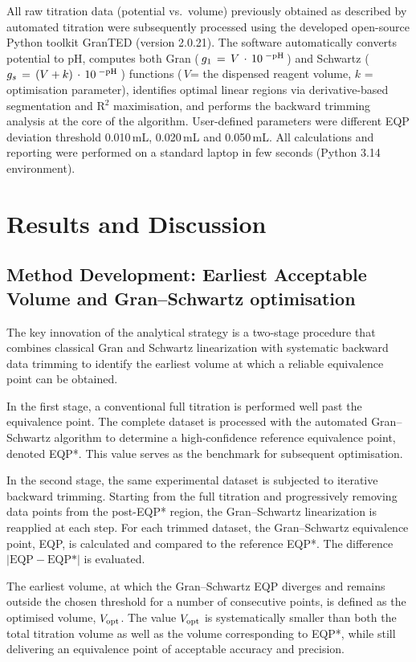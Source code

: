 \documentclass[twoside,twocolumn,9pt]{article}
\begin{document}
All raw titration data (potential vs.\, volume) previously obtained as described by automated titration were subsequently processed using the developed open-source Python toolkit \textsf{GranTED} (version 2.0.21). The software automatically converts potential to pH, computes both Gran (\,\(g_1\, =\, V\,\cdot\,10^{\;{\rm -pH}}\)\,) and Schwartz (\mbox{\,\(g_s\, =\, (V+k)\,\cdot\,10^{\;{\rm -pH}}\)}\,) functions (\,\(V\)= the dispensed reagent volume, \(k\) = optimisation parameter), identifies optimal linear regions via derivative-based segmentation and R$^2$ maximisation, and performs the backward trimming analysis at the core of the algorithm. User-defined parameters were different EQP deviation threshold 0.010\,mL, 0.020\,mL and 0.050\,mL. All calculations and reporting were performed on a standard laptop in few seconds (Python 3.14 environment).

\section*{Results and Discussion}

\subsection*{Method Development: Earliest Acceptable Volume and Gran--Schwartz optimisation}

The key innovation of the analytical strategy is a two-stage procedure that combines classical Gran and Schwartz linearization with systematic backward data trimming to identify the earliest volume at which a reliable equivalence point can be obtained. 

In the first stage, a conventional full titration is performed well past the equivalence point.
The complete dataset is processed with the automated Gran--Schwartz algorithm to determine a high-confidence reference equivalence point, denoted EQP*.
This value serves as the benchmark for subsequent optimisation.

In the second stage, the same experimental dataset is subjected to iterative backward trimming.
Starting from the full titration and progressively removing data points from the post-EQP* region, the Gran--Schwartz linearization is reapplied at each step.
For each trimmed dataset, the Gran--Schwartz equivalence point, EQP, is calculated and compared to the reference EQP*.
The difference $|\text{EQP} - \text{EQP*}|$ is evaluated.

The earliest volume, at which the Gran--Schwartz EQP diverges and remains outside the chosen threshold for a number of consecutive points, is defined as the optimised volume, $V_{\rm opt}$.
The value $V_{\rm opt}$ is systematically smaller than both the total titration volume as well as the volume corresponding to EQP*, while still delivering an equivalence point of acceptable accuracy and precision.
\end{document}
